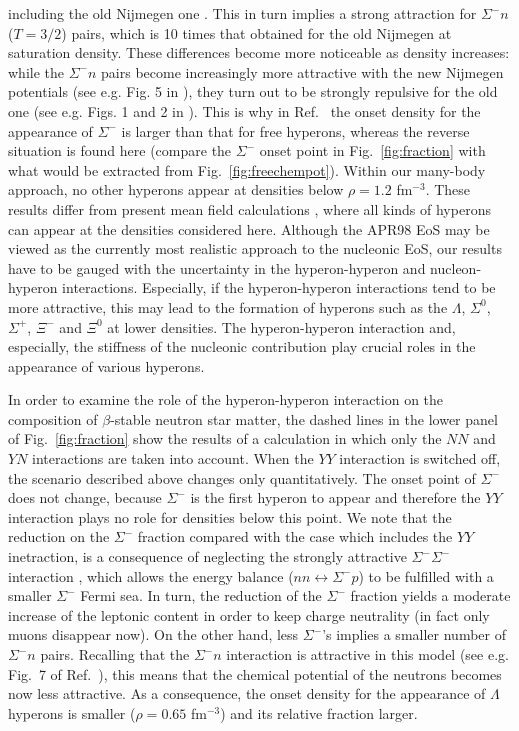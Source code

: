 including the old Nijmegen one \cite{nij89}. This 
in turn implies a strong
attraction for $\Sigma^- n$ ($T=3/2$) pairs, which is 10 times that
obtained for the old Nijmegen at saturation density. These differences
become more noticeable as density increases: 
while the $\Sigma^- n$ pairs become increasingly
more attractive with the new Nijmegen potentials (see e.g. Fig. 5
in \cite{isaac99}), they turn out to be strongly repulsive for the
old one (see e.g. Figs. 1 and 2 in \cite{bbs00}). This is why in Ref.\ 
\cite{bbs00} the onset density for the appearance of $\Sigma^-$ is larger
than that for free hyperons, whereas the reverse situation is found here
(compare the $\Sigma^-$ onset point in Fig.\  \ref{fig:fraction} with what
would be extracted from Fig.\ \ref{fig:freechempot}).
Within our many-body approach, no other
hyperons appear at densities below $\rho=1.2$ fm$^{-3}$. 
These results differ from present mean field calculations
\cite{prakash97,pke95,ms96}, where all kinds of hyperons can appear at
the densities considered here.
Although the APR98 EoS may be viewed as the currently
most realistic approach to the nucleonic EoS, our results have to be
gauged with the uncertainty in the hyperon-hyperon and nucleon-hyperon
interactions. Especially, if the hyperon-hyperon interactions tend to be
more attractive, this may lead to the formation of hyperons such as the
$\Lambda$, $\Sigma^0$, $\Sigma^+$, $\Xi^-$ and $\Xi^0$ at lower
densities. The hyperon-hyperon interaction and, especially, the stiffness of
the nucleonic contribution play crucial roles in the appearance of various
hyperons. 

In order to examine the role of the hyperon-hyperon interaction on the
composition of $\beta$-stable neutron star matter, the dashed lines in the
lower panel of Fig.\  \ref{fig:fraction} show the results of a calculation 
in which only the $NN$ and $YN$ interactions are taken into account. When
the $YY$ interaction is switched off, the scenario described above changes
only quantitatively. The onset point of $\Sigma^-$ does not change,
because $\Sigma^-$ is the first hyperon to appear and therefore the $YY$
interaction plays no role for densities below this point. 
We note that
the reduction on the $\Sigma^-$ fraction compared with the 
case which includes the $YY$ inetraction, is a consequence of neglecting
the strongly attractive $\Sigma^-\Sigma^-$ interaction \cite{sr99}, which
allows the energy balance ($n n \leftrightarrow \Sigma^- p$) to be 
fulfilled with a smaller
$\Sigma^-$ Fermi sea.
In turn, the reduction of the $\Sigma^-$ fraction 
yields a moderate 
increase of the leptonic content in order to keep charge neutrality (in
fact only muons disappear now). On the other hand, less $\Sigma^-$'s
implies a smaller number 
of $\Sigma^-$$n$ pairs. Recalling that the $\Sigma^-$$n$
interaction is attractive in this model 
(see e.g. Fig.\ 7 of Ref.\ \cite{isaac99}),
this means that the chemical potential of the neutrons becomes now less
attractive. As a consequence, the onset density for the
appearance of $\Lambda$ hyperons is smaller ($\rho=0.65$ fm$^{-3}$)
and its relative fraction larger.      

